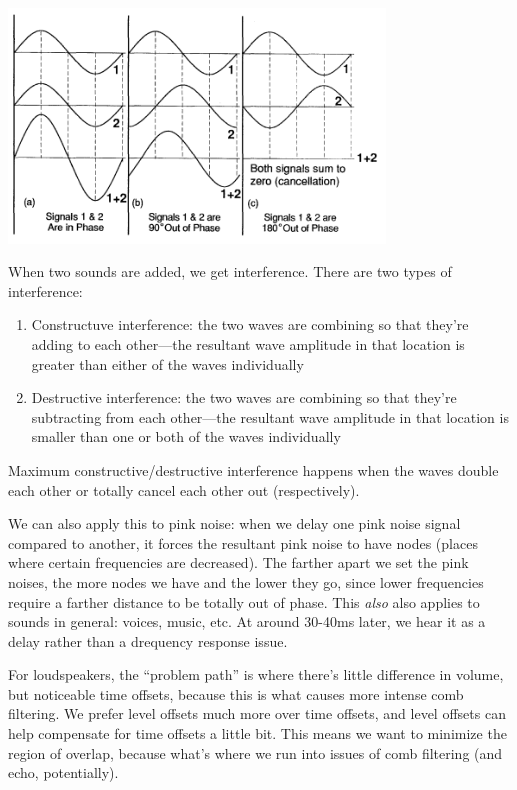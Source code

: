 \documentclass[a4paper]{article}
\begin{document}
\begin{center}
	\includegraphics[width=0.75\textwidth]{phase.png}
\end{center}

When two sounds are added, we get interference. There are two types of
interference:
\begin{enumerate}
	\item Constructuve interference: the two waves are combining so that
		they're adding to each other---the resultant wave amplitude 
		in that location is greater than either of the waves
		individually
	\item Destructive interference: the two waves are combining so that
		they're subtracting from each other---the resultant wave
		amplitude in that location is smaller than one or both of the
		waves individually
\end{enumerate}
Maximum constructive/destructive interference happens when the waves double
each other or totally cancel each other out (respectively).

We can also apply this to pink noise: when we delay one pink noise signal
compared to another, it forces the resultant pink noise to have nodes (places
where certain frequencies are decreased). The farther apart we set the pink
noises, the more nodes we have and the lower they go, since lower frequencies
require a farther distance to be totally out of phase. This \emph{also} also
applies to sounds in general: voices, music, etc. At around 30-40ms later, we
hear it as a delay rather than a drequency response issue.

For loudspeakers, the ``problem path'' is where there's little difference in
volume, but noticeable time offsets, because this is what causes more intense
comb filtering. We prefer level offsets much more over time offsets, and level
offsets can help compensate for time offsets a little bit. This means we want
to minimize the region of overlap, because what's where we run into issues of
comb filtering (and echo, potentially).
\end{document}
